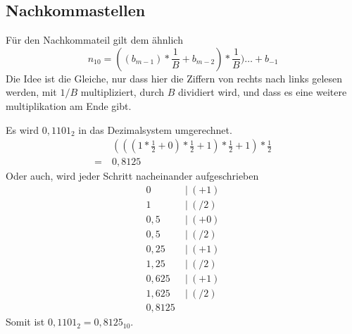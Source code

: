 \documentclass{article}
\begin{document}
\subsection{Nachkommastellen}
Für den Nachkommateil gilt dem ähnlich
\[
 n_{10} = ((b_{m-1}) * \frac{1}{B} + b_{m-2}) * \frac{1}{B}) \dots + b_{-1}
\]
Die Idee ist die Gleiche, nur dass hier die Ziffern von rechts nach links gelesen werden, mit $1/B$ multipliziert, \bzw durch $B$ dividiert wird, und dass es eine weitere multiplikation am Ende gibt.
\begin{zexample}
Es wird $0,1101_2$ in das Dezimalsystem umgerechnet.
\begin{align*}
   &\left(\left(\left(1*\frac{1}{2}+0\right)*\frac{1}{2}+1\right)*\frac{1}{2}+1\right)*\frac{1}{2} \\
=\ &0,8125
\end{align*}
Oder auch, wird jeder Schritt nacheinander aufgeschrieben
\begin{align*}
 0\ &\vert\ (+1) \\
 1\ &\vert\ (/2) \\
 0,5\ &\vert\ (+0) \\
 0,5\ &\vert\ (/2) \\
 0,25\ &\vert\ (+1) \\
 1,25\ &\vert\ (/2) \\
 0,625\ &\vert\ (+1) \\
 1,625\ &\vert\ (/2) \\
 0,8125\ &
\end{align*}
Somit ist $0,1101_2 = 0,8125_{10}$.
\end{zexample}
\end{document}
